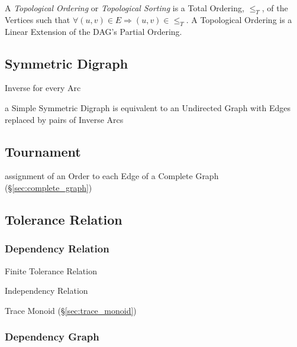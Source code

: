 A \emph{Topological Ordering} or \emph{Topological Sorting} is a Total
Ordering, $\leq_T$, of the Vertices such that $\forall (u,v) \in E
\Rightarrow (u,v) \in \leq_T$. A Topological Ordering is a Linear
Extension of the DAG's Partial Ordering. %



\subsection{Symmetric Digraph}\label{sec:symmetric_digraph}

Inverse for every Arc

a Simple Symmetric Digraph is equivalent to an Undirected Graph with
Edges replaced by pairs of Inverse Arcs



\subsection{Tournament}\label{sec:tournament}

assignment of an Order to each Edge of a Complete Graph
(\S\ref{sec:complete_graph})



\subsection{Tolerance Relation}\label{sec:tolerance_relation}


\subsubsection{Dependency Relation}\label{sec:dependency_relation}

Finite Tolerance Relation

Independency Relation

Trace Monoid (\S\ref{sec:trace_monoid})



\subsubsection{Dependency Graph}\label{sec:dependency_graph}


